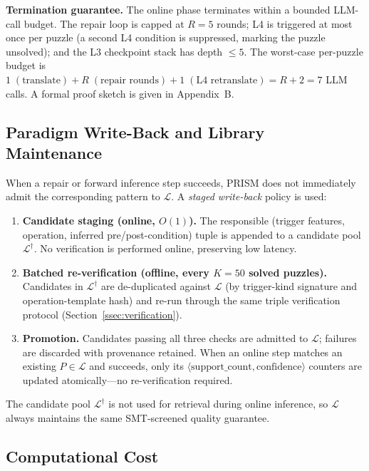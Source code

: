 \textbf{Termination guarantee.} The online phase terminates within a bounded LLM-call budget. The repair loop is capped at $R = 5$ rounds; L4 is triggered at most once per puzzle (a second L4 condition is suppressed, marking the puzzle unsolved); and the L3 checkpoint stack has depth $\leq 5$. The worst-case per-puzzle budget is $1\;(\text{translate}) + R\;(\text{repair rounds}) + 1\;(\text{L4 retranslate}) = R + 2 = 7$ LLM calls. A formal proof sketch is given in Appendix~B.

\subsection{Paradigm Write-Back and Library Maintenance}
\label{ssec:writeback}

When a repair or forward inference step succeeds, PRISM does not immediately admit the corresponding pattern to $\mathcal{L}$. A \textit{staged write-back} policy is used:

\begin{enumerate}
    \item \textbf{Candidate staging (online, $O(1)$).} The responsible (trigger features, operation, inferred pre/post-condition) tuple is appended to a candidate pool $\mathcal{L}^{\dagger}$. No verification is performed online, preserving low latency.
    \item \textbf{Batched re-verification (offline, every $K = 50$ solved puzzles).} Candidates in $\mathcal{L}^{\dagger}$ are de-duplicated against $\mathcal{L}$ (by trigger-kind signature and operation-template hash) and re-run through the same triple verification protocol (Section~\ref{ssec:verification}).
    \item \textbf{Promotion.} Candidates passing all three checks are admitted to $\mathcal{L}$; failures are discarded with provenance retained. When an online step matches an existing $P \in \mathcal{L}$ and succeeds, only its $\langle\text{support\_count}, \text{confidence}\rangle$ counters are updated atomically—no re-verification required.
\end{enumerate}

The candidate pool $\mathcal{L}^{\dagger}$ is not used for retrieval during online inference, so $\mathcal{L}$ always maintains the same SMT-screened quality guarantee.

\subsection{Computational Cost}
\label{ssec:cost}

